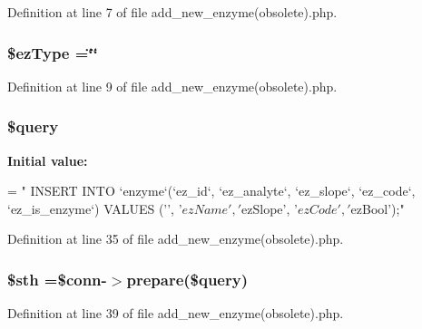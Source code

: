 Definition at line 7 of file add\-\_\-new\-\_\-enzyme(obsolete).\-php.

\hypertarget{add__new__enzyme_07obsolete_08_8php_aee528badcb788c913ffab530a5b876cf}{
\subsubsection[{\$ez\-Type}]{\setlength{\rightskip}{0pt plus 5cm}\$ez\-Type =\char`\"{}\char`\"{}}}\label{add__new__enzyme_07obsolete_08_8php_aee528badcb788c913ffab530a5b876cf}


Definition at line 9 of file add\-\_\-new\-\_\-enzyme(obsolete).\-php.

\hypertarget{add__new__enzyme_07obsolete_08_8php_af59a5f7cd609e592c41dc3643efd3c98}{
\subsubsection[{\$query}]{\setlength{\rightskip}{0pt plus 5cm}\$query}}\label{add__new__enzyme_07obsolete_08_8php_af59a5f7cd609e592c41dc3643efd3c98}
{\bfseries Initial value\-:}
\begin{DoxyCode}
= \textcolor{stringliteral}{"}
\textcolor{stringliteral}{    INSERT INTO `enzyme`(`ez\_id`, `ez\_analyte`, `ez\_slope`, `ez\_code`, `ez\_is\_enzyme`) VALUES ('',
       '$ezName', '$ezSlope', '$ezCode', '$ezBool');"}
\end{DoxyCode}


Definition at line 35 of file add\-\_\-new\-\_\-enzyme(obsolete).\-php.

\hypertarget{add__new__enzyme_07obsolete_08_8php_afa9126f9664959c02795be300a135f93}{
\subsubsection[{\$sth}]{\setlength{\rightskip}{0pt plus 5cm}\$sth =\$conn-\/$>$prepare(\$query)}}\label{add__new__enzyme_07obsolete_08_8php_afa9126f9664959c02795be300a135f93}


Definition at line 39 of file add\-\_\-new\-\_\-enzyme(obsolete).\-php.

